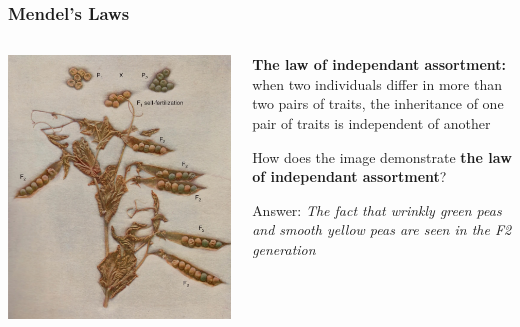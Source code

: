 \documentclass{beamer}
\begin{document}
\begin{frame}
	
	\frametitle{Mendel's Laws}
	\begin{columns}
		\begin{column}{0.6\textwidth}
			\includegraphics[keepaspectratio, width  =\textwidth]{img/crossedPeas}
			
		\end{column}
		\begin{column}{0.4\textwidth}
			\small	
			\textbf{The law of independant assortment:} when two individuals differ in more than two pairs of traits, the inheritance of one pair of traits is independent of another 
			\vspace{10pt}
			
			How does the image demonstrate \textbf{the law of  independant assortment}? \pause
			
			\vspace{10pt}
			
			Answer: \textit{The fact that wrinkly green peas and smooth yellow peas are seen in the F2 generation}			
			
			
		\end{column}		
		
	\end{columns}
\end{frame}
\end{document}
